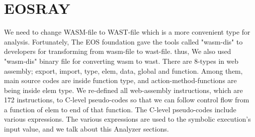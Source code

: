 \section{EOSRAY}
We need to change WASM-file to WAST-file which is a more convenient type for analysis. Fortunately, The EOS foundation gave the tools called "wasm-dis" to developers for transforming from wasm-file to wast-file. thus, We also used "wasm-dis" binary file for converting wasm to wast. There are 8-types in web assembly; export, import, type, elem, data, global and function. Among them, main source codes are inside function type, and action-method-functions are being inside elem type. We re-defined all web-assembly instructions, which are 172 instructions, to C-level pseudo-codes so that we can follow control flow from a function of elem to end of that function. The C-level pseudo-codes include various expressions. The various expressions are used to the symbolic execution's input value, and we talk about this Analyzer sections.


